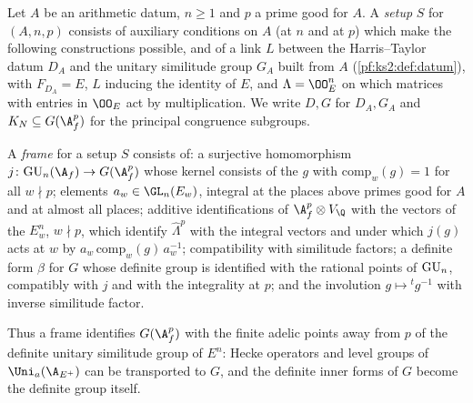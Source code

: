 \begin{definition}[Setups]\label{pf:geo:setup}
Let $A$ be an arithmetic datum, $n\ge1$ and $p$ a prime good for $A$. A \emph{setup} $S$ for $(A,n,p)$ consists of auxiliary
conditions on $A$ (at $n$ and at $p$) which make the following constructions possible, and of a link $L$ between the Harris--Taylor
datum $D_A$ and the unitary similitude group $G_A$ built from $A$ (\cref{pf:ks2:def:datum}), with $F_{D_A}=E$, $L$ inducing the
identity of $E$, and $\Lambda=\OO_E^n$ on which matrices with entries in $\OO_E$ act by multiplication. We write $D,G$ for $D_A,G_A$ and
$K_N\subseteq G(\A_f^p)$ for the principal congruence subgroups.
\end{definition}

\begin{definition}[Frames]\label{pf:geo:frame}
A \emph{frame} for a setup $S$ consists of: a surjective homomorphism $j\colon\geoGU_n(\A_f)\to G(\A_f^p)$ whose kernel
consists of the $g$ with $\mathrm{comp}_w(g)=1$ for all $w\nmid p$; elements $a_w\in\GL_n(E_w)$, integral at the places above
primes good for $A$ and at almost all places; additive identifications of $\A_f^p\otimes V_\Q$ with the vectors of the
$E_w^n$, $w\nmid p$, which identify $\hat\Lambda^p$ with the integral vectors and under which $j(g)$ acts at $w$ by
$a_w\,\mathrm{comp}_w(g)\,a_w^{-1}$; compatibility with similitude factors; a definite form $\beta$ for $G$ whose definite
group is identified with the rational points of $\mathrm{GU}_n$, compatibly with $j$ and with the integrality at $p$; and the
involution $g\mapsto{}^tg^{-1}$ with inverse similitude factor.
\end{definition}

Thus a frame identifies $G(\A_f^p)$ with the finite adelic points away from $p$ of the definite unitary similitude
group of $E^n$: Hecke operators and level groups of $\geoUa$ can be transported to $G$, and the definite inner forms of
$G$ become the definite group itself.


